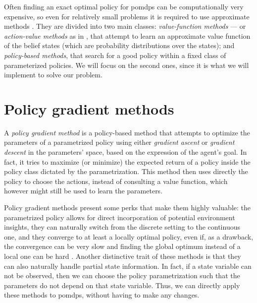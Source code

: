 Often finding an exact optimal policy for \acrshort{pomdp}s can be computationally very expensive, so even for relatively small problems it is required to use approximate methods \cite{Aberdeen2002ScalingIP}. They are divided into two main classes: \emph{value-function methods} --- or \emph{action-value methods} as in \cite{SuttonBarto}, that attempt to learn an approximate value function of the belief states (which are probability distributions over the states); and \emph{policy-based methods}, that search for a good policy within a fixed class of parameterized policies. We will focus on the second ones, since it is what we will implement to solve our problem.


\section{Policy gradient methods}
\label{sec:pgm}

A \emph{policy gradient method} is a policy-based method that attempts to optimize the parameters of a parametrized policy using either \emph{gradient  ascent} or \emph{gradient descent} in the parameters' space, based on the expression of the agent's goal. In fact, it tries to maximize (or minimize) the expected return of a policy inside the policy class dictated by the parametrization. This method then uses directly the policy to choose the actions, instead of consulting a value function, which however might still be used to learn the parameters.

Policy gradient methods present some perks that make them highly valuable: the parametrized policy allows for direct incorporation of potential environment insights, they can naturally switch from the discrete setting to the continuous one, and they converge to at least a locally optimal policy, even if, as a drawback, the convergence can be very slow and finding the global optimum instead of a local one can be hard \cite{Peters2010}. Another distinctive trait of these methods is that they can also naturally handle partial state information. In fact, if a state variable can not be observed, then we can choose the policy parametrization such that the parameters do not depend on that state variable. Thus, we can directly apply these methods to \acrshort{pomdp}s, without having to make any changes.

